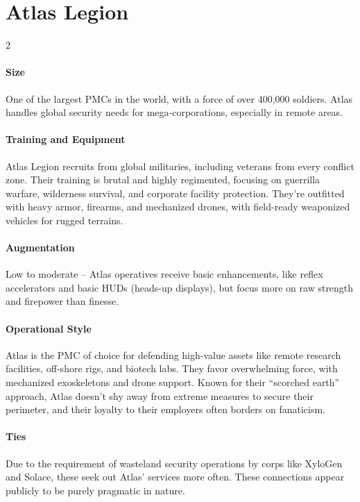 \section*{Atlas Legion}
\vspace{5mm}
\begin{multicols}{2}
\paragraph{Size}
One of the largest PMCs in the world, with a force of over 400,000 soldiers. Atlas handles global security needs for mega-corporations, especially in remote areas.
\paragraph{Training and Equipment}
Atlas Legion recruits from global militaries, including veterans from every conflict zone. Their training is brutal and highly regimented, focusing on guerrilla warfare, wilderness survival, and corporate facility protection. They’re outfitted with heavy armor, firearms, and mechanized drones, with field-ready weaponized vehicles for rugged terrains.
\paragraph{Augmentation}
Low to moderate – Atlas operatives receive basic enhancements, like reflex accelerators and basic HUDs (heads-up displays), but focus more on raw strength and firepower than finesse.
\paragraph{Operational Style}
Atlas is the PMC of choice for defending high-value assets like remote research facilities, off-shore rigs, and biotech labs. They favor overwhelming force, with mechanized exoskeletons and drone support. Known for their “scorched earth” approach, Atlas doesn’t shy away from extreme measures to secure their perimeter, and their loyalty to their employers often borders on fanaticism.
\paragraph{Ties}
Due to the requirement of wasteland security operations by corps like XyloGen and Solace, these seek out Atlas' services more often.
These connections appear publicly to be purely pragmatic in nature.
\end{multicols}

